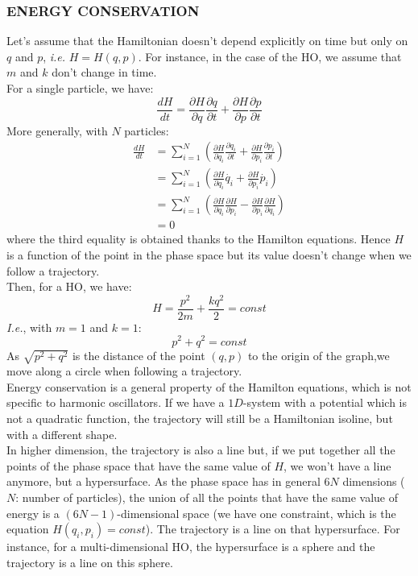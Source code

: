     \subsubsection{ENERGY CONSERVATION}
    Let's assume that the Hamiltonian doesn't depend explicitly on time but only on $q$ and $p$, \textit{i.e.} $H=H(q,p)$. For instance, in the case of the HO, we assume that $m$ and $k$ don't change in time.
    \\For a single particle, we have:
    \begin{equation}
        \frac{dH}{dt}=\frac{\partial H}{\partial q} \frac{\partial q}{\partial t} + \frac{\partial H}{\partial p} \frac{\partial p}{\partial t}
    \end{equation}
    More generally, with $N$ particles:
    \begin{equation}
    \begin{aligned}
        \frac{dH}{dt}&=\sum_{i=1}^N \left( \frac{\partial H}{\partial q_i} \frac{\partial q_i}{\partial t} + \frac{\partial H}{\partial p_i} \frac{\partial p_i}{\partial t} \right)\\&=\sum_{i=1}^N \left( \frac{\partial H}{\partial q_i} \dot{q_i} + \frac{\partial H}{\partial p_i} \dot{p_i} \right)\\&=\sum_{i=1}^N \left( \frac{\partial H}{\partial q_i} \frac{\partial H}{\partial p_i} - \frac{\partial H}{\partial p_i} \frac{\partial H}{\partial q_i} \right)\\&=0
        \end{aligned}
    \end{equation}
    where the third equality is obtained thanks to the Hamilton equations. Hence $H$ is a function of the point in the phase space but its value doesn't change when we follow a trajectory.
    \\Then, for a HO, we have:
    \begin{equation}
        H=\frac{p^2}{2m}+\frac{kq^2}{2}=const
    \end{equation}
    \textit{I.e.}, with $m=1$ and $k=1$:
    \begin{equation}
        p^2+q^2=const
    \end{equation}
    As $\sqrt{p^2+q^2}$ is the distance of the point $(q,p)$ to the origin of the graph,we move along a circle when following a trajectory.
    \\Energy conservation is a general property of the Hamilton equations, which is not specific to harmonic oscillators. If we have a $1D$-system with a potential which is not a quadratic function, the trajectory will still be a Hamiltonian isoline, but with a different shape.
    \\In higher dimension, the trajectory is also a line but, if we put together all the points of the phase space that have the same value of $H$, we won't have a line anymore, but a hypersurface. As the phase space has in general $6N$ dimensions ($N$: number of particles), the union of all the points that have the same value of energy is a $(6N-1)$-dimensional space (we have one constraint, which is the equation $H(q_i,p_i)=const$). The trajectory is a line on that hypersurface. For instance, for a multi-dimensional HO, the hypersurface is a sphere and the trajectory is a line on this sphere.
    
